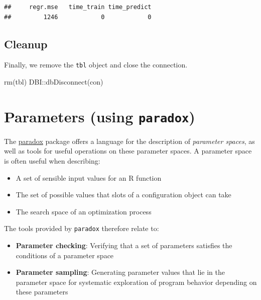 \documentclass[
]{scrbook}
\newenvironment{Shaded}{\begin{snugshade}}{\end{snugshade}}
\newcommand{\FunctionTok}[1]{\textcolor[rgb]{0.00,0.00,0.00}{#1}}
\newcommand{\NormalTok}[1]{#1}
\newcommand{\SpecialCharTok}[1]{\textcolor[rgb]{0.00,0.00,0.00}{#1}}
\providecommand{\tightlist}{%
  \setlength{\itemsep}{0pt}\setlength{\parskip}{0pt}}
\renewenvironment{Shaded} {\begin{snugshade}\small} {\end{snugshade}}
\begin{document}
\begin{verbatim}
##     regr.mse   time_train time_predict 
##         1246            0            0
\end{verbatim}

\hypertarget{cleanup}{%
\subsection{Cleanup}\label{cleanup}}

Finally, we remove the \texttt{tbl} object and close the connection.

\begin{Shaded}
\begin{Highlighting}[]
\FunctionTok{rm}\NormalTok{(tbl)}
\NormalTok{DBI}\SpecialCharTok{::}\FunctionTok{dbDisconnect}\NormalTok{(con)}
\end{Highlighting}
\end{Shaded}

\hypertarget{paradox}{%
\section{\texorpdfstring{Parameters (using \texttt{paradox})}{Parameters (using paradox)}}\label{paradox}}

The \href{https://paradox.mlr-org.com}{paradox} package offers a language for the description of \emph{parameter spaces}, as well as tools for useful operations on these parameter spaces.
A parameter space is often useful when describing:

\begin{itemize}
\tightlist
\item
  A set of sensible input values for an R function
\item
  The set of possible values that slots of a configuration object can take
\item
  The search space of an optimization process
\end{itemize}

The tools provided by \texttt{paradox} therefore relate to:

\begin{itemize}
\tightlist
\item
  \textbf{Parameter checking}: Verifying that a set of parameters satisfies the conditions of a parameter space
\item
  \textbf{Parameter sampling}: Generating parameter values that lie in the parameter space for systematic exploration of program behavior depending on these parameters
\end{itemize}
\end{document}
